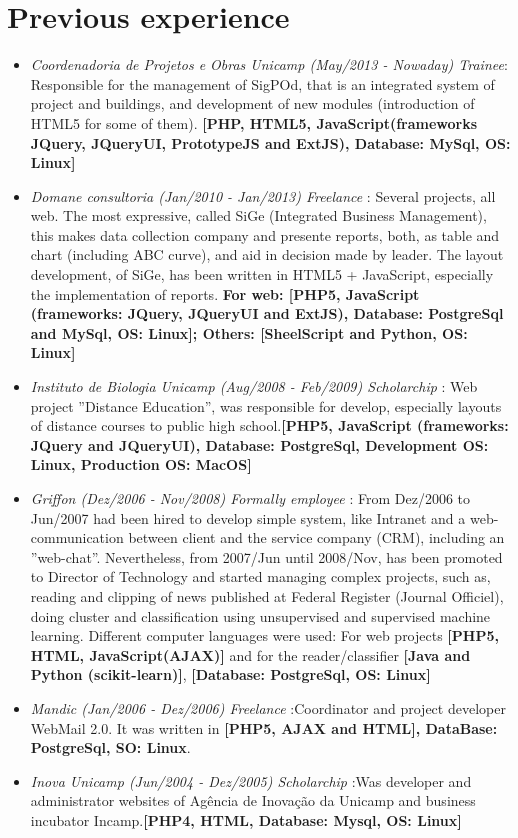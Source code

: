 \documentclass[a4paper,10pt]{article}
\begin{document}
\section{Previous experience}
\begin{itemize}
\item \emph{Coordenadoria de Projetos e Obras Unicamp (May/2013 - Nowaday) Trainee}: Responsible
for the management of SigPOd, that is an integrated system of project and buildings, and development of new modules (introduction of HTML5 for some of them). \textbf{[PHP, HTML5, JavaScript(frameworks JQuery, JQueryUI, PrototypeJS and ExtJS), Database: MySql, OS: Linux]}
\item \emph{Domane consultoria (Jan/2010 - Jan/2013) Freelance }: Several projects, all web. The most expressive, called SiGe (Integrated Business Management), this makes data collection company and presente reports, both, as table and chart (including ABC curve), and aid in decision made by leader. The layout development, of SiGe, has been written in HTML5 + JavaScript, especially the implementation of reports. \textbf{For web: [PHP5, JavaScript (frameworks: JQuery, JQueryUI and ExtJS), Database: PostgreSql and MySql, OS: Linux]; Others: [SheelScript and Python, OS: Linux]}
\item \emph{Instituto de Biologia Unicamp (Aug/2008 - Feb/2009) Scholarchip }: Web project ''Distance Education'', was responsible for develop, especially layouts of distance courses to public high school.\textbf{[PHP5, JavaScript (frameworks: JQuery and JQueryUI), Database: PostgreSql, Development OS: Linux, Production OS: MacOS]}
\item \emph{Griffon (Dez/2006 - Nov/2008) Formally employee }: From Dez/2006 to Jun/2007 had been hired to develop simple system, like Intranet and a web-communication between client and the service company (CRM), including an ''web-chat''. Nevertheless, from 2007/Jun until 2008/Nov, has been promoted to Director of Technology and started managing complex projects, such as, reading and clipping of news published at Federal Register (Journal Officiel), doing cluster and classification using unsupervised and supervised machine learning. Different computer languages were used: For web projects \textbf{[PHP5, HTML, JavaScript(AJAX)]} and for the reader/classifier \textbf{[Java and Python (scikit-learn)]}, \textbf{[Database: PostgreSql, OS: Linux]}
\item \emph{Mandic (Jan/2006 - Dez/2006) Freelance }:Coordinator and project developer WebMail 2.0. It was written in \textbf{[PHP5, AJAX and HTML], DataBase: PostgreSql, SO: Linux}.
\item \emph{Inova Unicamp (Jun/2004 - Dez/2005) Scholarchip }:Was developer and administrator websites of Agência de Inovação da Unicamp and business incubator Incamp.\textbf{[PHP4, HTML, Database: Mysql, OS: Linux]}
\end{itemize}
\end{document}
